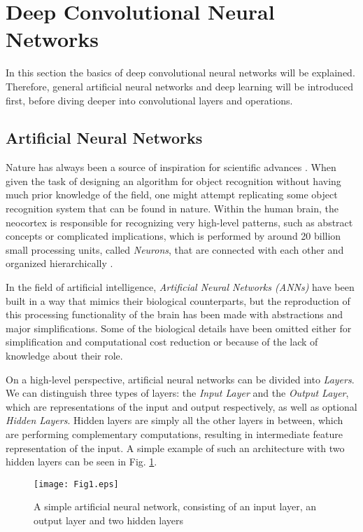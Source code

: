 \documentclass[conference]{IEEEtran}
\begin{document}
\section{Deep Convolutional Neural Networks}\label{sec:dcnn}
In this section the basics of deep convolutional neural networks will be explained. Therefore, general artificial neural networks and deep learning will be introduced first, before diving deeper into convolutional layers and operations.


\subsection{Artificial Neural Networks}\label{subsec:ann}
Nature has always been a source of inspiration for scientific advances \cite{Biomimetics}. When given the task of designing an algorithm for object recognition without having much prior knowledge of the field, one might attempt replicating some object recognition system that can be found in nature. Within the human brain, the neocortex is responsible for recognizing very high-level patterns, such as abstract concepts or complicated implications, which is performed by around 20 billion small processing units, called \emph{Neurons}, that are connected with each other and organized hierarchically \cite{Neuroscience,Kurzweil}.

In the field of artificial intelligence, \emph{Artificial Neural Networks (ANNs)} have been built in a way that mimics their biological counterparts, but the reproduction of this processing functionality of the brain has been made with abstractions and major simplifications. Some of the biological details have been omitted either for simplification and computational cost reduction or because of the lack of knowledge about their role. 

On a high-level perspective, artificial neural networks can be divided into \emph{Layers}. We can distinguish three types of layers: the \emph{Input Layer} and the \emph{Output Layer}, which are representations of the input and output respectively, as well as optional \emph{Hidden Layers}. Hidden layers are simply all the other layers in between, which are performing complementary computations, resulting in intermediate feature representation of the input. A simple example of such an architecture with two hidden layers can be seen in Fig. \ref{fig:ann}.

\begin{figure}
\texttt{[image: Fig1.eps]}
\caption{A simple artificial neural network, consisting of an input layer, an output layer and two hidden layers}
\label{fig:ann}
\end{figure}
\end{document}
